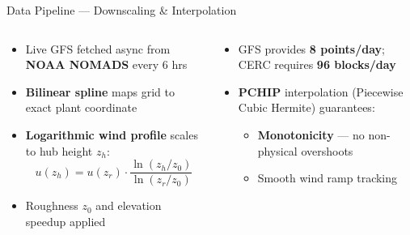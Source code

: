 \documentclass[aspectratio=169,10pt]{beamer}
\newcommand{\emphblue}[1]{{\color{WindBlue}\textbf{#1}}}
\newcommand{\emphgreen}[1]{{\color{MLgreen}\textbf{#1}}}
\newcommand{\emphred}[1]{{\color{DSMred}\textbf{#1}}}
\begin{document}
\begin{frame}{Data Pipeline — Downscaling \& Interpolation}
  \begin{columns}[T]
      \begin{tcolorbox}[statbox, title={\faGlobe\; Spatial Downscaling (25~km $\to$ 1~km)}]
        \begin{itemize}[leftmargin=1em, itemsep=4pt, font=\small]
          \item Live GFS fetched async from \emphblue{NOAA NOMADS} every 6 hrs
          \item \emphblue{Bilinear spline} maps grid to exact plant coordinate
          \item \emphblue{Logarithmic wind profile} scales to hub height $z_h$:
            \[ u(z_h)=u(z_r)\cdot\frac{\ln(z_h/z_0)}{\ln(z_r/z_0)} \]
          \item Roughness $z_0$ and elevation speedup applied
        \end{itemize}
      \end{tcolorbox}

      \begin{tcolorbox}[orangebox, title={\faClock\; Temporal Interpolation (3-hr $\to$ 15-min)}]
        \begin{itemize}[leftmargin=1em, itemsep=4pt, font=\small]
          \item GFS provides \emphred{8 points/day}; CERC requires \emphblue{96 blocks/day}
          \item \emphblue{PCHIP} interpolation (Piecewise Cubic Hermite) guarantees:
            \begin{itemize}[leftmargin=1em, itemsep=2pt]
              \item \emphgreen{Monotonicity} — no non-physical overshoots
              \item Smooth wind ramp tracking
            \end{itemize}
        \end{itemize}
      \end{tcolorbox}


\end{columns}
\end{frame}
\end{document}
